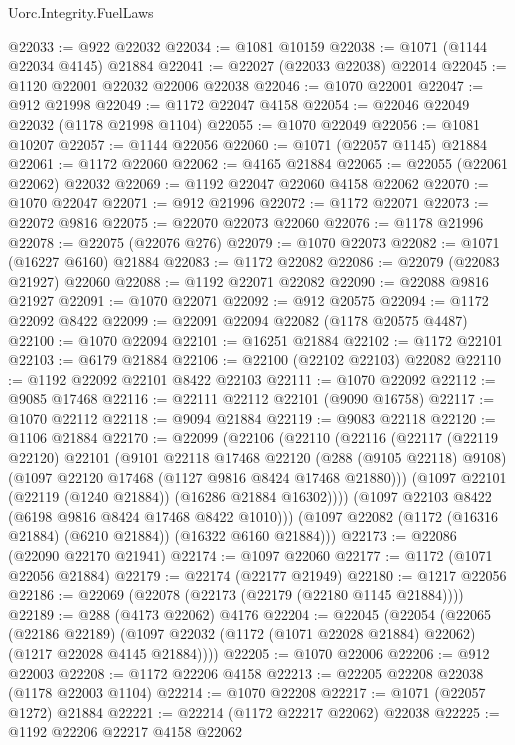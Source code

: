 \begin{lexlean}{Uorc.Integrity.FuelLaws}
\begin{coremodule}
@22033 := @922 @22032
@22034 := @1081 @10159
@22038 := @1071 (@1144 @22034 @4145) @21884
@22041 := @22027 (@22033 @22038) @22014
@22045 := @1120 @22001 @22032 @22006 @22038
@22046 := @1070 @22001
@22047 := @912 @21998
@22049 := @1172 @22047 @4158
@22054 := @22046 @22049 @22032 (@1178 @21998 @1104)
@22055 := @1070 @22049
@22056 := @1081 @10207
@22057 := @1144 @22056
@22060 := @1071 (@22057 @1145) @21884
@22061 := @1172 @22060
@22062 := @4165 @21884
@22065 := @22055 (@22061 @22062) @22032
@22069 := @1192 @22047 @22060 @4158 @22062
@22070 := @1070 @22047
@22071 := @912 @21996
@22072 := @1172 @22071
@22073 := @22072 @9816
@22075 := @22070 @22073 @22060
@22076 := @1178 @21996
@22078 := @22075 (@22076 @276)
@22079 := @1070 @22073
@22082 := @1071 (@16227 @6160) @21884
@22083 := @1172 @22082
@22086 := @22079 (@22083 @21927) @22060
@22088 := @1192 @22071 @22082
@22090 := @22088 @9816 @21927
@22091 := @1070 @22071
@22092 := @912 @20575
@22094 := @1172 @22092 @8422
@22099 := @22091 @22094 @22082 (@1178 @20575 @4487)
@22100 := @1070 @22094
@22101 := @16251 @21884
@22102 := @1172 @22101
@22103 := @6179 @21884
@22106 := @22100 (@22102 @22103) @22082
@22110 := @1192 @22092 @22101 @8422 @22103
@22111 := @1070 @22092
@22112 := @9085 @17468
@22116 := @22111 @22112 @22101 (@9090 @16758)
@22117 := @1070 @22112
@22118 := @9094 @21884
@22119 := @9083 @22118
@22120 := @1106 @21884
@22170 := @22099
    (@22106
      (@22110
        (@22116
          (@22117
            (@22119 @22120)
            @22101
            (@9101
              @22118
              @17468
              @22120
              (@288 (@9105 @22118) @9108)
              (@1097 @22120 @17468 (@1127 @9816 @8424 @17468 @21880)))
            (@1097 @22101 (@22119 (@1240 @21884)) (@16286 @21884 @16302))))
        (@1097 @22103 @8422 (@6198 @9816 @8424 @17468 @8422 @1010)))
      (@1097 @22082 (@1172 (@16316 @21884) (@6210 @21884)) (@16322 @6160 @21884)))
@22173 := @22086 (@22090 @22170 @21941)
@22174 := @1097 @22060
@22177 := @1172 (@1071 @22056 @21884)
@22179 := @22174 (@22177 @21949)
@22180 := @1217 @22056
@22186 := @22069 (@22078 (@22173 (@22179 (@22180 @1145 @21884))))
@22189 := @288 (@4173 @22062) @4176
@22204 := @22045
    (@22054
      (@22065
        (@22186 @22189)
        (@1097 @22032 (@1172 (@1071 @22028 @21884) @22062) (@1217 @22028 @4145 @21884))))
@22205 := @1070 @22006
@22206 := @912 @22003
@22208 := @1172 @22206 @4158
@22213 := @22205 @22208 @22038 (@1178 @22003 @1104)
@22214 := @1070 @22208
@22217 := @1071 (@22057 @1272) @21884
@22221 := @22214 (@1172 @22217 @22062) @22038
@22225 := @1192 @22206 @22217 @4158 @22062

\end{coremodule}
\end{lexlean}
